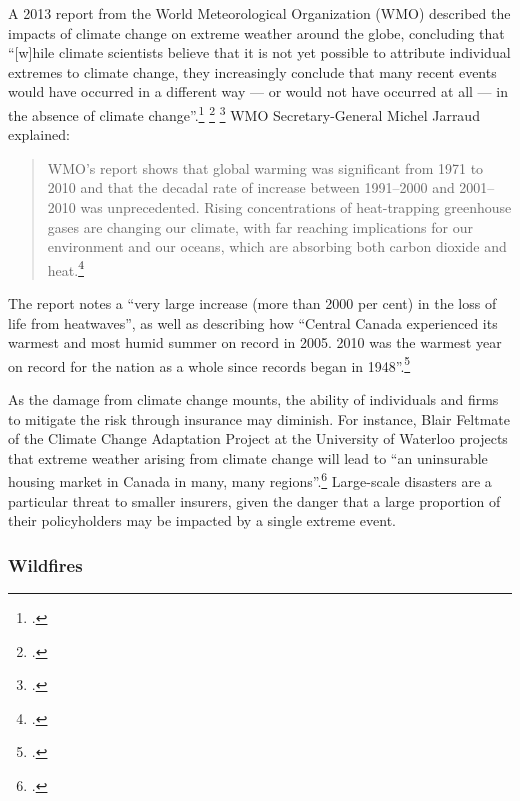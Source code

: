 \documentclass[10pt]{article}
\begin{document}
A 2013 report from the World Meteorological Organization (WMO) described the impacts of climate change on extreme weather around the globe, concluding that ``[w]hile climate scientists believe that it is not yet possible to attribute individual extremes to climate change, they increasingly conclude that many recent events would have occurred in a different way --- or would not have occurred at all --- in the absence of climate change''.\footcite[][p. 15]{WMOExtremesReport} \footcite[See also: ][]{BBConWMO} \footcite[][]{ReutersonWMO}
WMO Secretary-General Michel Jarraud explained:
\begin{quote}
WMO's report shows that global warming was significant from 1971 to 2010 and that the decadal rate of increase between 1991--2000 and 2001--2010 was unprecedented.  Rising concentrations of heat-trapping greenhouse gases are changing our climate, with far reaching implications for our environment and our oceans, which are absorbing both carbon dioxide and heat.\footcite[][]{WMOExtremesPR}
\end{quote}
The report notes a ``very large increase (more than 2000 per cent) in the loss of life from heatwaves'', as well as describing how ``Central Canada experienced its warmest and most humid summer on record in 2005. 2010 was the warmest year on record for the nation as a whole since records began in 1948''.\footcite[][p. 6, 8]{WMOExtremesReport}



As the damage from climate change mounts, the ability of individuals and firms to mitigate the risk through insurance may diminish.
For instance, Blair Feltmate of the Climate Change Adaptation Project at the University of Waterloo projects that extreme weather arising from climate change will lead to ``an uninsurable housing market in Canada in many, many regions''.\footcite[][]{GMUninsurable}
Large-scale disasters are a particular threat to smaller insurers, given the danger that a large proportion of their policyholders may be impacted by a single extreme event.



	\subsubsection{Wildfires}
	
\end{document}
